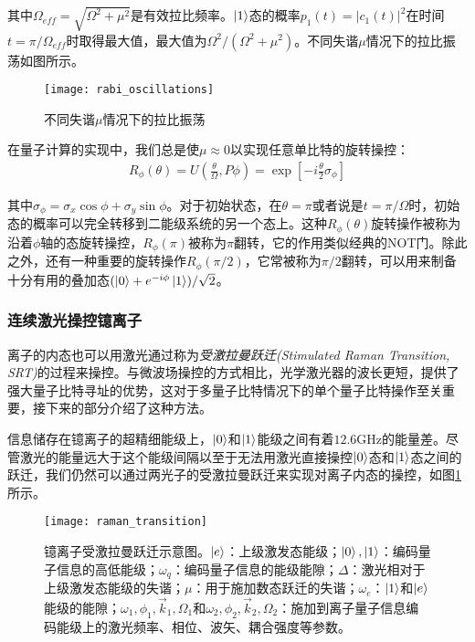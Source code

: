 其中$\Omega_{eff}=\sqrt{\Omega^2+\mu^2}$是有效拉比频率\cite[]{Foot_2005}。$\ket{1}$态的概率$p_1(t)=|c_1(t)|^2$在时间$t=\pi/\Omega_{eff}$时取得最大值，最大值为$\Omega^2/(\Omega^2+\mu^2)$。不同失谐$\mu$情况下的拉比振荡如图所示。

\begin{figure}
    \centering
    \caption[不同失谐$\mu$情况下的拉比振荡]{不同失谐$\mu$情况下的拉比振荡\cite[]{Lu_2019}}
    \texttt{[image: rabi\_oscillations]}
\end{figure}

在量子计算的实现中，我们总是使$\mu\approx0$以实现任意单比特的旋转操控：
\begin{align}
    R_\phi(\theta)=U\left(\frac{\theta}{\Omega},P\phi\right)=\exp[-i\frac{\theta}{2}\sigma_\phi]
\end{align}

其中$\sigma_\phi=\sigma_x\cos{\phi}+\sigma_y\sin{\phi}$。对于初始状态，在$\theta=\pi$或者说是$t=\pi/\Omega$时，初始态的概率可以完全转移到二能级系统的另一个态上。这种$R_\phi(\theta)$旋转操作被称为沿着$\phi$轴的态旋转操控，$R_\phi(\pi)$被称为$\pi$翻转，它的作用类似经典的NOT门。除此之外，还有一种重要的旋转操作$R_\phi(\pi/2)$，它常被称为$\pi/2$翻转，可以用来制备十分有用的叠加态$(\ket{0}+e^{-i\phi}\ket{1})/\sqrt{2}$。



\subsubsection[连续激光操控镱离子]{连续激光操控镱离子\label{section:raman_transition}}

离子的内态也可以用激光通过称为\emph{受激拉曼跃迁(Stimulated Raman Transition, SRT)}的过程来操控。与微波场操控的方式相比，光学激光器的波长更短，提供了强大量子比特寻址的优势，这对于多量子比特情况下的单个量子比特操作至关重要，接下来的部分介绍了这种方法。

信息储存在镱离子的超精细能级上，$\ket{0}$和$\ket{1}$能级之间有着$12.6$GHz的能量差。尽管激光的能量远大于这个能级间隔以至于无法用激光直接操控$\ket{0}$态和$\ket{1}$态之间的跃迁，我们仍然可以通过两光子的受激拉曼跃迁来实现对离子内态的操控，如图\ref{fig:raman_transition}所示。
\begin{figure}
    \centering
    \caption[镱离子受激拉曼跃迁示意图]{镱离子受激拉曼跃迁示意图。$\ket{e}$：上级激发态能级；$\ket{0},\ket{1}$：编码量子信息的高低能级；$\omega_{q}$：编码量子信息的能级能隙；$\Delta$：激光相对于上级激发态能级的失谐；$\mu$：用于施加数态跃迁的失谐；$\omega_e$：$\ket{1}$和$\ket{e}$能级的能隙；$\omega_1,\phi_1,\vec{k}_1, \Omega_1$和$\omega_2,\phi_2,\vec{k}_2, \Omega_2$：施加到离子量子信息编码能级上的激光频率、相位、波矢、耦合强度等参数。\label{fig:raman_transition}}
    \texttt{[image: raman\_transition]}
\end{figure}


